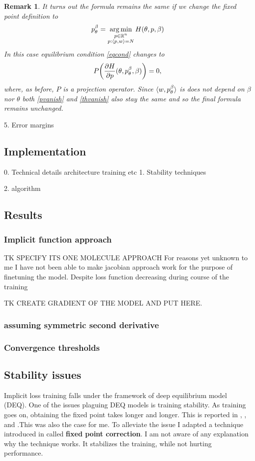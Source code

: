 \documentclass[a4paper,10pt]{report}
\newtheorem{remark}{Remark}
\begin{document}
\begin{remark}
 It turns out the formula remains the same if we change the fixed point definition to
\begin{equation}
 p_\theta^\beta = \operatorname*{arg\,min}_{\substack{p \in \mathbb{R}^n \\ p: \langle p, w \rangle=N }} H(\theta, p, \beta)
\end{equation}
In this case equilibrium condition \ref{eqcond} changes to
\begin{equation*}
P\bigg(\frac{\partial H}{\partial p}(\theta,p_\theta^{\beta}, \beta)\bigg)=0,
\end{equation*}
where, as before, $P$ is a projection operator. Since $\langle w, p_\theta^{\beta} \rangle$ is does not depend on $\beta$ nor $\theta$ both \ref{pvanish} and \ref{thvanish} also stay the same and so the final formula remains unchanged.

\end{remark}



5. Error margins
\subsection{Implementation}
0. Technical details
    architecture
    training
    etc
1. Stability techniques

2. algorithm
\subsection{Results}
\subsubsection{Implicit function approach}
TK SPECIFY ITS ONE MOLECULE APPROACH
 For reasons yet unknown to me I have not been able to make jacobian approach work for the purpose of finetuning the model. Despite loss function decreasing during course of the training

 TK CREATE GRADIENT OF THE MODEL AND PUT HERE.

\subsubsection{assuming symmetric second derivative}
\subsubsection{Convergence thresholds}
\subsection{Stability issues}
Implicit loss training falls under the framework of deep equilibrium model (DEQ). One of the issues plaguing DEQ models is training stability. As training goes on, obtaining the fixed point takes longer and longer. This is reported in \cite{opticalflow}, \cite{bai2021stabilizing}, \cite{burger2025dequify} and \cite{geng2023torchdeq}.This was also the case for me. To alleviate the issue I adapted a technique introduced in \cite{opticalflow} called \textbf{fixed point correction}. I am not aware of any explanation why the technique works. It stabilizes the training, while not hurting performance.
\end{document}
